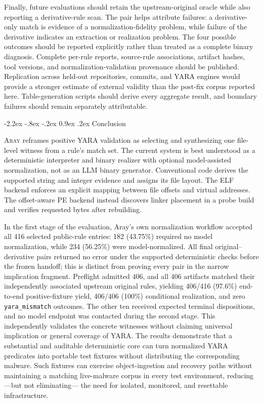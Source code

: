 \documentclass[11pt,twocolumn]{article}
\makeatletter
\newcommand{\tool}{\textsc{Aray}\xspace}
\newcommand{\code}[1]{\texttt{#1}}
\renewcommand\section{\@startsection{section}{1}{\z@}%
  {-2.2ex \@plus -.8ex \@minus -.2ex}%
  {0.9ex \@plus .2ex}%
  {\normalfont\large\bfseries}}
\makeatother
\begin{document}
Finally, future evaluations should retain the upstream-original oracle while also
reporting a derivative-rule scan. The pair helps attribute failures: a
derivative-only match is evidence of a normalization-fidelity problem, while
failure of the derivative indicates an extraction or realization problem. The
four possible outcomes should be reported explicitly rather than treated as a
complete binary diagnosis. Complete per-rule reports, source-rule associations,
artifact hashes, tool versions, and normalization-validation provenance should be
published. Replication across held-out repositories, commits, and YARA engines
would provide a stronger estimate of external validity than the post-fix corpus
reported here. Table-generation scripts should derive every aggregate result,
and boundary failures should remain separately attributable.

\section{Conclusion}

\tool reframes positive YARA validation as selecting and synthesizing one
file-level witness from a rule's match set.
The current system is best understood as a deterministic interpreter and binary
realizer with optional model-assisted normalization, not as an LLM binary
generator. Conventional code derives the supported string and integer evidence
and assigns its file layout. The ELF backend enforces an explicit mapping between
file offsets and virtual addresses. The offset-aware PE backend instead discovers
linker placement in a probe build and verifies requested bytes after rebuilding.

In the first stage of the evaluation, Aray's own normalization workflow accepted
all 416 selected public-rule entries: 182 (43.75\%) required no model
normalization, while 234 (56.25\%) were model-normalized. All final
original--derivative pairs returned no error under the supported deterministic
checks before the frozen handoff; this is distinct from proving every pair in the
narrow implication fragment. Preflight admitted 406, and all 406 artifacts matched
their independently associated upstream original rules, yielding 406/416
(97.6\%) end-to-end positive-fixture yield, 406/406 (100\%) conditional
realization, and zero \code{yara\_mismatch} outcomes. The other ten received
expected terminal dispositions, and no model endpoint was contacted during the
second stage. This independently validates the concrete witnesses without
claiming universal implication or general coverage of YARA. The results
demonstrate that a substantial and auditable deterministic core can turn
normalized YARA predicates into portable test fixtures without distributing the
corresponding malware. Such fixtures can
exercise object-ingestion and recovery paths without maintaining a matching
live-malware corpus in every test environment, reducing---but not eliminating---
the need for isolated, monitored, and resettable infrastructure.
\end{document}
